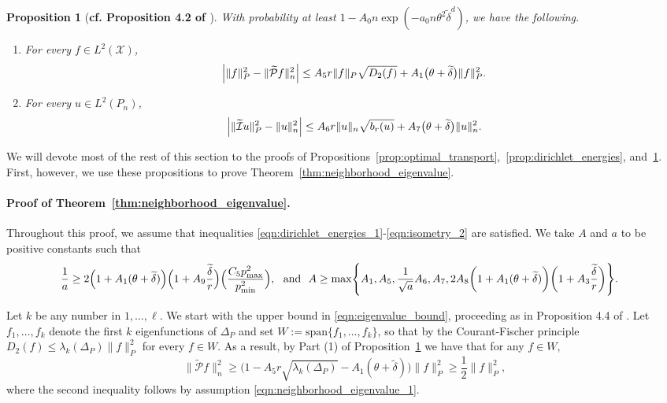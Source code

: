 \documentclass[twoside]{article}
\newcommand{\1}{\mathbf{1}}
\newcommand{\Xset}{\mathcal{X}}
\newcommand{\Leb}{L}
\newcommand{\mc}[1]{\mathcal{#1}}
\newcommand{\wt}[1]{\widetilde{#1}}
\newtheorem{proposition}{Proposition}
\theoremstyle{definition}
\theoremstyle{remark}
\begin{document}
\begin{proposition}[\textbf{cf. Proposition 4.2 of \citet{calder2019}}]
	\label{prop:isometry}
	With probability at least $1 - A_0n\exp(-a_0n\theta^2\wt{\delta}^{d})$, we have the following.
	\begin{enumerate}[(1)]
		\item For every $f \in \Leb^2(\Xset)$,
		\begin{equation}
		\label{eqn:isometry_1}
		\Bigl|\|f\|_{P}^2 - \|\wt{\mc{P}}f\|_{n}^2\Bigr| \leq A_5 r \|f\|_{P} \sqrt{D_2(f)} + A_1\bigl(\theta + \wt{\delta}\bigr)\|f\|_{P}^2.
		\end{equation}
		\item For every $u \in \Leb^2(P_n)$,
		\begin{equation}
		\label{eqn:isometry_2}
		\Bigl|\|\wt{\mc{I}}u\|_{P}^2 - \|u\|_{n}^2\Bigr| \leq A_6 r \|u\|_{n} \sqrt{b_r(u)} + A_7\bigl(\theta + \wt{\delta}\bigr) \|u\|_{n}^2.
		\end{equation}
	\end{enumerate}
\end{proposition}

We will devote most of the rest of this section to the proofs of Propositions~\ref{prop:optimal_transport},~\ref{prop:dirichlet_energies}, and~\ref{prop:isometry}. First, however, we use these propositions to prove Theorem~\ref{thm:neighborhood_eigenvalue}.

\paragraph{Proof of Theorem~\ref{thm:neighborhood_eigenvalue}.}
Throughout this proof, we assume that inequalities \eqref{eqn:dirichlet_energies_1}-\eqref{eqn:isometry_2} are satisfied. We take $A$ and $a$ to be positive constants such that
\begin{align*}
\frac{1}{a} & \geq 2\Bigl(1 + A_1(\theta + \wt{\delta})\Bigr)\Bigl(1 + A_9\frac{\wt{\delta}}{r}\Bigr)\Bigl(\frac{C_5 p_{\max}^2}{p_{\min}^2}\Bigr) ,~~\textrm{and}~~A \geq \max\Biggl\{A_1,A_5, \frac{1}{\sqrt{a}}A_6, A_7, 2A_8\biggl(1 + A_1(\theta + \wt{\delta})\biggr) \biggl(1 + A_3\frac{\wt{\delta}}{r}\biggr) \Biggr\}.
\end{align*}

Let $k$ be any number in $1,\ldots,\ell$. We start with the upper bound in \eqref{eqn:eigenvalue_bound}, proceeding as in Proposition 4.4 of \citet{burago2014}. Let $f_1,\ldots,f_{k}$ denote the first $k$ eigenfunctions of $\Delta_P$ and set $W := \mathrm{span}\{f_1,\ldots,f_k\}$, so that by the Courant-Fischer principle $D_2(f) \leq \lambda_k(\Delta_P) \|f\|_{P}^2$ for every $f \in W$. As a result, by Part (1) of Proposition~\ref{prop:isometry} we have that for any $f \in W$,
\begin{equation*}
\bigl\|\wt{\mc{P}}f\bigr\|_{n}^2 \geq \biggl(1 - A_5r \sqrt{\lambda_{k}(\Delta_P)} - A_1(\theta + \wt{\delta})\biggr)\|f\|_{P}^2  \geq \frac{1}{2} \|f\|_{P}^2,
\end{equation*}
where the second inequality follows by assumption \eqref{eqn:neighborhood_eigenvalue_1}. 
\end{document}
